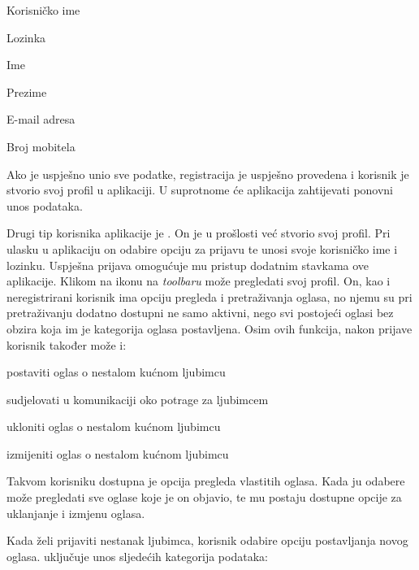 		\begin{packed_item}
			
			\item  Korisničko ime
			\item  Lozinka
			\item  Ime
			\item  Prezime
			\item  E-mail adresa
			\item  Broj mobitela
			
		\end{packed_item}

		Ako je uspješno unio sve podatke, registracija je uspješno provedena i korisnik je stvorio svoj profil u aplikaciji. U suprotnome će aplikacija zahtijevati ponovni unos podataka.

Drugi tip korisnika aplikacije je . On je u prošlosti već stvorio svoj profil. Pri ulasku u aplikaciju on odabire opciju za prijavu te unosi svoje korisničko ime i lozinku. Uspješna prijava omogućuje mu pristup dodatnim stavkama ove aplikacije. Klikom na ikonu na \textit{toolbaru} može pregledati svoj profil. On, kao i neregistrirani korisnik ima opciju pregleda i pretraživanja oglasa, no njemu su pri pretraživanju dodatno dostupni ne samo aktivni, nego svi postojeći oglasi bez obzira koja im je kategorija oglasa postavljena. Osim ovih funkcija, nakon prijave korisnik također može i:

		\begin{packed_enum}
			
			\item  postaviti oglas o nestalom kućnom ljubimcu 
			\item  sudjelovati u komunikaciji oko potrage za ljubimcem 
			\item  ukloniti oglas o nestalom kućnom ljubimcu 
			\item  izmijeniti oglas o nestalom kućnom ljubimcu 
			
		\end{packed_enum}

		Takvom korisniku dostupna je opcija pregleda vlastitih oglasa. Kada ju odabere može pregledati sve oglase koje je on objavio, te mu postaju dostupne opcije za uklanjanje i izmjenu oglasa.

		Kada želi prijaviti nestanak ljubimca, korisnik odabire opciju postavljanja novog oglasa.  uključuje unos sljedećih kategorija podataka:

